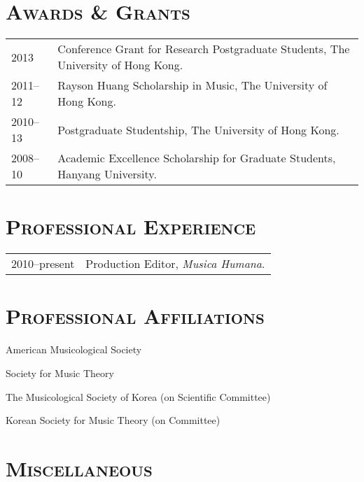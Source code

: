 \documentclass[letter,11pt]{article}
\begin{document}
  \vspace{5mm}
  
  \section*{\textsc{Awards \& Grants}}
  
  \hspace*{-0.25cm}
  \begin{tabular}{p{2.5cm} l}
    2013 & Conference Grant for Research Postgraduate Students, The University
    of Hong Kong.\\
    
    2011–12 & Rayson Huang Scholarship in Music, The University of Hong Kong.\\
    
    2010–13 & Postgraduate Studentship, The University of Hong Kong.\\
    
    2008–10 & Academic Excellence Scholarship for Graduate Students, Hanyang
    University.
  \end{tabular}
  
  \vspace{5mm}
  
  \section*{\textsc{Professional Experience}}
  
  \hspace*{-0.25cm}
  \begin{tabular}{p{2.5cm} l}
    2010--present & Production Editor, \textit{Musica Humana}.
  \end{tabular}
  
  \vspace{5mm}
  
  \section*{\textsc{Professional Affiliations}}
  
  American Musicological Society
  
  \noindent Society for Music Theory
  
  \noindent The Musicological Society of Korea (on Scientific Committee)
  
  \noindent Korean Society for Music Theory (on Committee)
  
  \section*{\textsc{Miscellaneous}}
  
\end{document}
